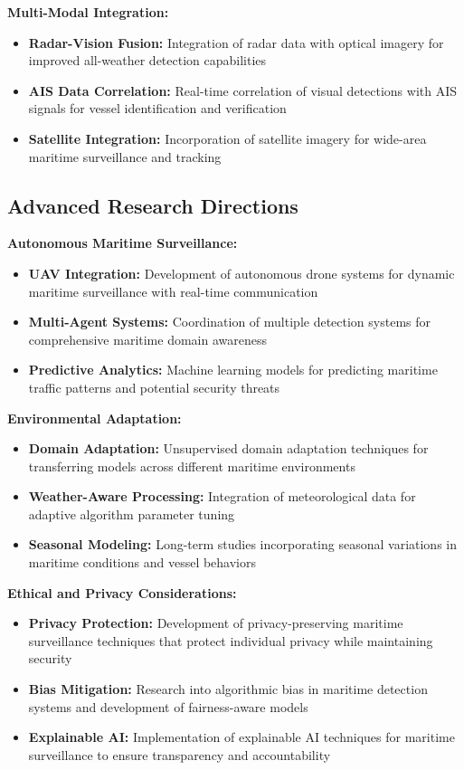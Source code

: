 \documentclass[a4paper,11pt]{article}
\begin{document}
\textbf{Multi-Modal Integration:}
\begin{itemize}
    \item \textbf{Radar-Vision Fusion:} Integration of radar data with optical imagery for improved all-weather detection capabilities
    \item \textbf{AIS Data Correlation:} Real-time correlation of visual detections with AIS signals for vessel identification and verification
    \item \textbf{Satellite Integration:} Incorporation of satellite imagery for wide-area maritime surveillance and tracking
\end{itemize}

\subsection{Advanced Research Directions}

\textbf{Autonomous Maritime Surveillance:}
\begin{itemize}
    \item \textbf{UAV Integration:} Development of autonomous drone systems for dynamic maritime surveillance with real-time communication
    \item \textbf{Multi-Agent Systems:} Coordination of multiple detection systems for comprehensive maritime domain awareness
    \item \textbf{Predictive Analytics:} Machine learning models for predicting maritime traffic patterns and potential security threats
\end{itemize}

\textbf{Environmental Adaptation:}
\begin{itemize}
    \item \textbf{Domain Adaptation:} Unsupervised domain adaptation techniques for transferring models across different maritime environments
    \item \textbf{Weather-Aware Processing:} Integration of meteorological data for adaptive algorithm parameter tuning
    \item \textbf{Seasonal Modeling:} Long-term studies incorporating seasonal variations in maritime conditions and vessel behaviors
\end{itemize}

\textbf{Ethical and Privacy Considerations:}
\begin{itemize}
    \item \textbf{Privacy Protection:} Development of privacy-preserving maritime surveillance techniques that protect individual privacy while maintaining security
    \item \textbf{Bias Mitigation:} Research into algorithmic bias in maritime detection systems and development of fairness-aware models
    \item \textbf{Explainable AI:} Implementation of explainable AI techniques for maritime surveillance to ensure transparency and accountability
\end{itemize}
\end{document}
